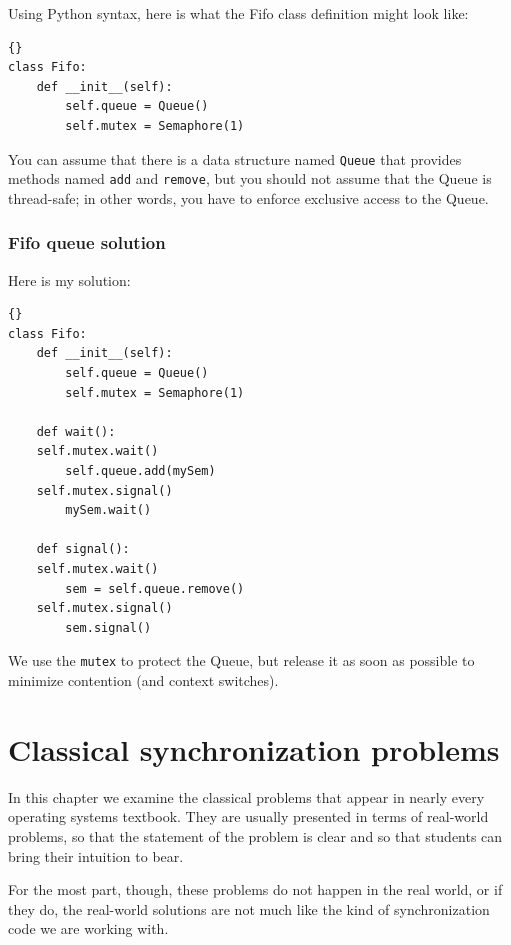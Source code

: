 \documentclass{book}
\newcommand{\clearemptydoublepage}{\newpage\cleardoublepage}
\begin{document}
Using Python syntax, here is what the Fifo class definition might
look like:

\begin{lstlisting}[caption={Fifo class definition}]{}
class Fifo:
    def __init__(self):
        self.queue = Queue()
        self.mutex = Semaphore(1)
\end{lstlisting}

You can assume that there is a data structure named
{\tt Queue} that provides methods named {\tt add} and {\tt remove},
but you should not assume that the Queue is thread-safe; in
other words, you have to enforce exclusive access to
the Queue.


\clearemptydoublepage
\subsection {Fifo queue solution}

Here is my solution:

\begin{lstlisting}[caption={Fifo queue solution}]{}
class Fifo:
    def __init__(self):
        self.queue = Queue()
        self.mutex = Semaphore(1)

    def wait():
	self.mutex.wait()
        self.queue.add(mySem)
	self.mutex.signal()
        mySem.wait()

    def signal():
	self.mutex.wait()
        sem = self.queue.remove()
	self.mutex.signal()
        sem.signal()
\end{lstlisting}

We use the {\tt mutex} to protect the Queue, but release it as
soon as possible to minimize contention (and context switches).



\clearemptydoublepage
\chapter{Classical synchronization problems}

In this chapter we examine the classical problems that appear
in nearly every operating systems textbook.  They
are usually presented in terms of real-world problems, so
that the statement of the problem is clear and so that students
can bring their intuition to bear.

For the most part, though, these problems do not happen in the
real world, or if they do, the real-world solutions are not much
like the kind of synchronization code we are working with.
\end{document}
